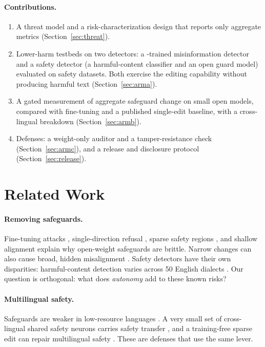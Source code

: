 \documentclass[11pt]{article}
\begin{document}
\paragraph{Contributions.}
\begin{enumerate}\itemsep0pt
\item A threat model and a risk-characterization design that reports only aggregate metrics (Section~\ref{sec:threat}).
\item Lower-harm testbeds on two detectors: a \bluff{}-trained misinformation detector and a safety detector (a harmful-content classifier and an open guard model) evaluated on safety datasets. Both exercise the editing capability without producing harmful text (Section~\ref{sec:arma}).
\item A gated measurement of aggregate safeguard change on small open models, compared with fine-tuning and a published single-edit baseline, with a cross-lingual breakdown (Section~\ref{sec:armb}).
\item Defenses: a weight-only auditor and a tamper-resistance check (Section~\ref{sec:armc}), and a release and disclosure protocol (Section~\ref{sec:release}).
\end{enumerate}

\section{Related Work}
\paragraph{Removing safeguards.} Fine-tuning attacks \citep{qi2024finetuning}, single-direction refusal \citep{arditi2024refusal}, sparse safety regions \citep{wei2024brittleness}, and shallow alignment \citep{qi2025shallow} explain why open-weight safeguards are brittle. Narrow changes can also cause broad, hidden misalignment \citep{betley2025emergent}. Safety detectors have their own disparities: harmful-content detection varies across 50 English dialects \citep{lucas2026diaharm}. Our question is orthogonal: what does \emph{autonomy} add to these known risks?

\paragraph{Multilingual safety.} Safeguards are weaker in low-resource languages \citep{yong2023lowresource,deng2024multijail}. A very small set of cross-lingual shared safety neurons carries safety transfer \citep{zhang2026safetyneurons}, and a training-free sparse edit can repair multilingual safety \citep{liang2026sparse}. These are defenses that use the same lever.
\end{document}
